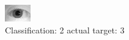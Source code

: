 \begin{figure}[h!]
\begin{center}
\includegraphics[width=0.60\columnwidth]{figures/ID1077_class_2_target_3.png}
\end{center}
\caption{ Classification: 2 actual target: 3}
\label{fig:ID1077_class_2_target_3}
\end{figure}
